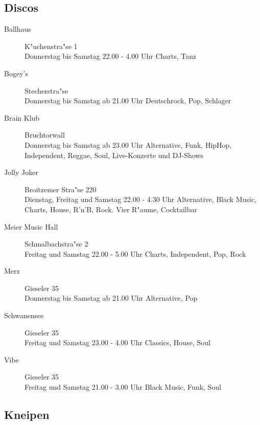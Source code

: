 \subsection{Discos}

\begin{description}
\item[Ballhaus]
K"uchenstra"se 1\\
Donnerstag bis Samstag 22.00 - 4.00 Uhr
Charts, Tanz

\item[Bogey's]
Stecherstra"se\\
Donnerstag bis Samstag ab 21.00 Uhr
Deutschrock, Pop, Schlager

\item[Brain Klub]
Bruchtorwall\\
Donnerstag bis Samstag ab 23.00 Uhr
Alternative, Funk, HipHop, Independent, Reggae, Soul, Live-Konzerte und DJ-Shows\\

\item[Jolly Joker]
Broitzemer Stra"se 220\\
Dienstag, Freitag und Samstag 22.00 - 4.30 Uhr
Alternative, Black Music, Charts, House, R'n'B, Rock. Vier R"aume, Cocktailbar

\item[Meier Music Hall]
Schmalbachstra"se 2\\
Freitag und Samstag 22.00 - 5.00 Uhr
Charts, Independent, Pop, Rock\\

\item[Merz]
Gieseler 35\\
Donnerstag bis Samstag ab 21.00 Uhr
Alternative, Pop\\

\item[Schwanensee]
Gieseler 35\\
Freitag und Samstag 23.00 - 4.00 Uhr
Classics, House, Soul

\item[Vibe]
Gieseler 35\\
Freitag und Samstag 21.00 - 3.00 Uhr
Black Music, Funk, Soul\\

\end{description}


\subsection{Kneipen}

